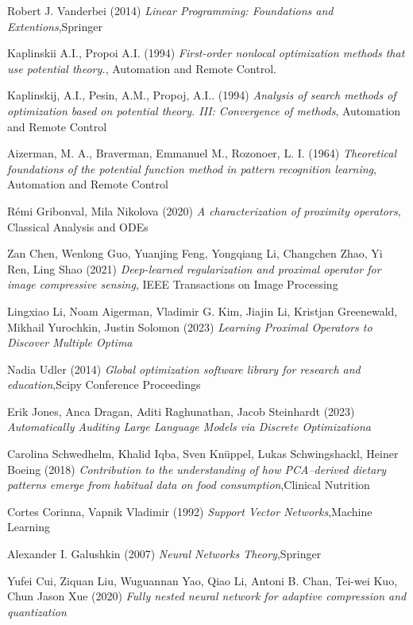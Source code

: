 \documentclass{article} %
\begin{document}
 \begin{thebibliography}{9}
Robert J. Vanderbei (2014) \emph{ Linear Programming: Foundations and Extentions},Springer

Kaplinskii A.I., Propoi A.I. (1994) \emph{First-order nonlocal optimization methods that use potential theory.}, Automation and Remote Control. 

Kaplinskij, A.I., Pesin, A.M., Propoj, A.I.. (1994) \emph{  Analysis of search methods of optimization based on potential theory. III: Convergence of methods}, Automation and Remote Control

Aizerman, M. A., Braverman, Emmanuel M., Rozonoer, L. I. (1964) \emph{ Theoretical foundations of the potential function method in pattern recognition learning}, Automation and Remote Control

Rémi Gribonval, Mila Nikolova (2020) \emph{ A characterization of proximity operators}, Classical Analysis and ODEs

Zan Chen, Wenlong Guo, Yuanjing Feng, Yongqiang Li, Changchen Zhao, Yi Ren, Ling Shao (2021) \emph{ Deep-learned regularization and proximal operator for image compressive sensing}, IEEE Transactions on Image Processing

Lingxiao Li, Noam Aigerman, Vladimir G. Kim, Jiajin Li, Kristjan Greenewald, Mikhail Yurochkin, Justin Solomon (2023) \emph{ Learning Proximal Operators to Discover  Multiple Optima}

Nadia Udler (2014) \emph{ Global optimization software library for research and education},Scipy Conference Proceedings

 Erik Jones, Anca Dragan, Aditi Raghunathan, Jacob Steinhardt (2023) \emph{ Automatically Auditing Large Language Models via Discrete
 Optimizationa}

Carolina Schwedhelm,  Khalid Iqba, Sven Knüppel,  Lukas Schwingshackl, Heiner Boeing (2018) \emph{ Contribution to the understanding of how PCA–derived dietary patterns emerge from habitual data on food consumption},Clinical Nutrition

Cortes Corinna, Vapnik Vladimir (1992) \emph{Support Vector Networks},Machine Learning

Alexander I. Galushkin (2007) \emph{ Neural Networks Theory},Springer

Yufei Cui, Ziquan Liu, Wuguannan Yao, Qiao Li, Antoni B. Chan, Tei-wei Kuo, Chun Jason Xue (2020) \emph{Fully nested neural network for adaptive compression and quantization}



\end{thebibliography}
\end{document}
